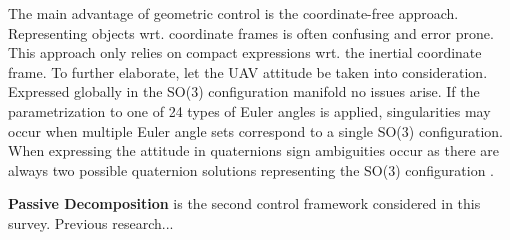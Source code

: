 The main advantage of geometric control is the coordinate-free approach. Representing objects wrt. coordinate frames is often confusing and error prone. This approach only relies on compact expressions wrt. the inertial coordinate frame. To further elaborate, let the UAV attitude be taken into consideration. Expressed globally in the SO(3) configuration manifold no issues arise. If the parametrization to one of 24 types of Euler angles is applied, singularities may occur when multiple Euler angle sets correspond to a single SO(3) configuration. When expressing the attitude in quaternions sign ambiguities occur as there are always two possible quaternion solutions representing the SO(3) configuration \cite{euler}.

\noindent \textbf{Passive Decomposition} is the second control framework considered in this survey. Previous research... \cite{LeePassive} \cite{passive6} \cite{passive8} \cite{passive12}